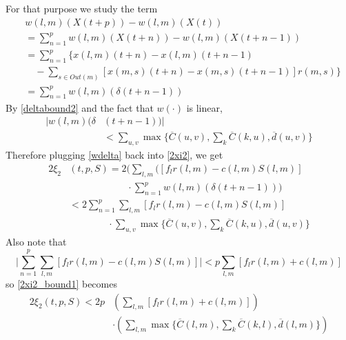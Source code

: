 %
For that purpose we study the term
\begin{align} \nonumber
&w(l,m)(X(t+p))   -  w(l,m)(X(t)) \\ \nonumber
& = \sum_{n=1}^{p} w(l,m)(X(t+n)) - w(l,m)(X(t + n - 1)) \\ \nonumber
&= \sum_{n=1}^{p} \Big\{ x(l,m)(t + n) - x(l,m)(t + n - 1)   \\ \nonumber 
&  \quad - \sum_{s \in Out(m)}[ x(m,s)(t + n) - x(m,s)(t + n - 1) ]r(m,s)  \Big\} \\ 
&= \sum_{n=1}^{p}  w(l,m)( \delta(t + n - 1)) 
\end{align}
{\color{red}
By \eqref{deltabound2} and the fact that $w(\cdot)$ is linear,  }
\begin{align} \nonumber
\vert w(l,m)(\delta&(t + n -1)) \vert \\  \label{wdelta}
&< \sum_{u,v} \max\Big\{  \overline{C}(u,v), \sum_{k}\overline{C}(k,u), \overline{d}(u,v)\Big\}
\end{align}
Therefore plugging \eqref{wdelta} back into \eqref{2xi2}, we get
\begin{align} \nonumber 
2\xi_2&(t,p,S) = 2\bigg( \sum_{l,m}\big([f_{l}r(l,m) - c(l,m)S(l,m)] \\  \nonumber
&\qquad \qquad \qquad \cdot \sum_{n=1}^{p}  w(l,m)( \delta(t + n - 1))\bigg)  \\ \nonumber
&< 2 \sum_{n=1}^{p}  \sum_{l,m}[f_{l}r(l,m) - c(l,m)S(l,m)] \\ 
&\qquad \qquad \cdot\sum_{u,v} \max\Big\{  \overline{C}(u,v), \sum_{k}\overline{C}(k,u), \overline{d}(u,v)\Big\} \label{2xi2_bound1}
\end{align}
Also note that 
\begin{equation}
\vert \sum_{n=1}^{p}  \sum_{l,m}[f_{l}r(l,m) - c(l,m)S(l,m)] \vert < p \sum_{l,m}[f_{l}r(l,m) + c(l,m)]
\end{equation}
so \eqref{2xi2_bound1} becomes
\begin{align} \label{2xi2_bound2}
2\xi_2(t,p,S) < 2 p &\left( \sum_{l,m}[f_{l}r(l,m) + c(l,m)]\right)\\ \nonumber
&\cdot\left( \sum_{l,m} \max\Big\{  \overline{C}(l,m), \sum_{k}\overline{C}(k,l), \overline{d}(l,m)\Big\} \right)
\end{align}

